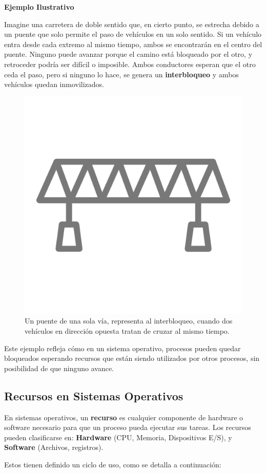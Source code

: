 \textbf{Ejemplo Ilustrativo}

Imagine una carretera de doble sentido que, en cierto punto, se estrecha debido a un puente que solo permite el paso de vehículos en un solo sentido. Si un vehículo entra desde cada extremo al mismo tiempo, ambos se encontrarán en el centro del puente. Ninguno puede avanzar porque el camino está bloqueado por el otro, y retroceder podría ser difícil o imposible. Ambos conductores esperan que el otro ceda el paso, pero si ninguno lo hace, se genera un \textbf{interbloqueo} y ambos vehículos quedan inmovilizados.

\begin{figure}[H] \centering \includegraphics[width=0.6\linewidth]{Imagenes/puente.png} \caption{Un puente de una sola vía, representa al interbloqueo, cuando dos vehículos en dirección opuesta tratan de cruzar al mismo tiempo.} \end{figure}

Este ejemplo refleja cómo en un sistema operativo, procesos pueden quedar bloqueados esperando recursos que están siendo utilizados por otros procesos, sin posibilidad de que ninguno avance.

\subsection{Recursos en Sistemas Operativos}


En sistemas operativos, un \textbf{recurso} es cualquier componente de hardware o software necesario para que un proceso pueda ejecutar sus tareas. Los recursos pueden clasificarse en:
\textbf{Hardware} (CPU, Memoria, Dispositivos E/S), y \textbf{Software} (Archivos, registros). 

Estos  tienen definido un ciclo de uso, como se detalla a continuación:


